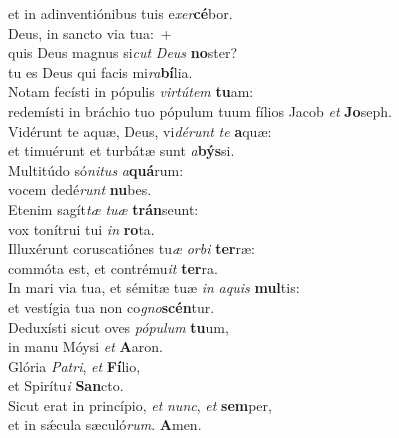 \evenverse et in adinventiónibus tuis e\textit{xer}\textbf{cé}bor.\\
\oddverse Deus, in sancto via tua:~+\\
\oddverse  quis Deus magnus si\textit{cut} \textit{De}\textit{us} \textbf{no}ster?~\*\\
\oddverse tu es Deus qui facis mi\textit{ra}\textbf{bí}lia.\\
\evenverse Notam fecísti in pópulis \textit{vir}\textit{tú}\textit{tem} \textbf{tu}am:~\*\\
\evenverse redemísti in bráchio tuo pópulum tuum fílios Jacob \textit{et} \textbf{Jo}seph.\\
\oddverse Vidérunt te aquæ, Deus, vi\textit{dé}\textit{runt} \textit{te} \textbf{a}quæ:~\*\\
\oddverse et timuérunt et turbátæ sunt \textit{a}\textbf{býs}si.\\
\evenverse Multitúdo só\textit{ni}\textit{tus} \textit{a}\textbf{quá}rum:~\*\\
\evenverse vocem dedé\textit{runt} \textbf{nu}bes.\\
\oddverse Etenim sagít\textit{tæ} \textit{tu}\textit{æ} \textbf{trán}seunt:~\*\\
\oddverse vox tonítrui tui \textit{in} \textbf{ro}ta.\\
\evenverse Illuxérunt coruscatiónes tu\textit{æ} \textit{or}\textit{bi} \textbf{ter}ræ:~\*\\
\evenverse commóta est, et contrému\textit{it} \textbf{ter}ra.\\
\oddverse In mari via tua, et sémitæ tuæ \textit{in} \textit{a}\textit{quis} \textbf{mul}tis:~\*\\
\oddverse et vestígia tua non co\textit{gno}\textbf{scén}tur.\\
\evenverse Deduxísti sicut oves \textit{pó}\textit{pu}\textit{lum} \textbf{tu}um,~\*\\
\evenverse in manu Móysi \textit{et} \textbf{A}aron.\\
\oddverse Glória \textit{Pa}\textit{tri}, \textit{et} \textbf{Fí}lio,~\*\\
\oddverse et Spirítu\textit{i} \textbf{San}cto.\\
\evenverse Sicut erat in princípio, \textit{et} \textit{nunc}, \textit{et} \textbf{sem}per,~\*\\
\evenverse et in sǽcula sæculó\textit{rum}. \textbf{A}men.\\

